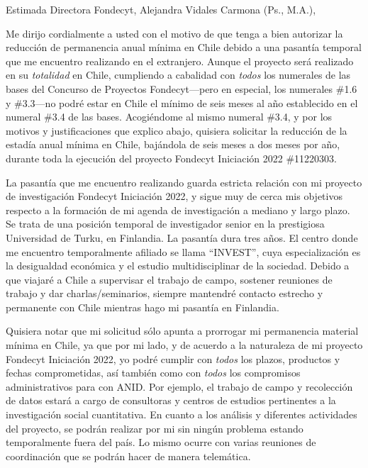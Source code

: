 \documentclass[9pt,stdletter,dateno,sigleft,openany]{newlfm} %
\begin{document}
\begin{newlfm}




\vspace{-2cm}
Estimada Directora Fondecyt, Alejandra Vidales Carmona (Ps., M.A.),

Me dirijo cordialmente a usted con el motivo de que tenga a bien autorizar la reducci\'on de permanencia anual m\'inima en Chile debido a una pasant\'ia temporal que me encuentro realizando en el extranjero. Aunque el proyecto ser\'a realizado en su \emph{totalidad} en Chile, cumpliendo a cabalidad con \emph{todos} los numerales de las bases del Concurso de Proyectos Fondecyt---pero en especial, los numerales \#1.6 y \#3.3---no podr\'e estar en Chile el m\'inimo de seis meses al a\~no establecido en el numeral \#3.4 de las bases. Acogi\'endome al mismo numeral \#3.4, y por los motivos y justificaciones que explico abajo, quisiera solicitar la reducci\'on de la estad\'ia anual m\'inima en Chile, baj\'andola de seis meses a dos meses por a\~no, durante toda la ejecuci\'on del proyecto Fondecyt Iniciaci\'on 2022 \#11220303. 

La pasant\'ia que me encuentro realizando guarda estricta relaci\'on con mi proyecto de investigaci\'on Fondecyt Iniciaci\'on 2022, y sigue muy de cerca mis objetivos respecto a la formaci\'on de mi agenda de investigaci\'on a mediano y largo plazo. Se trata de una posici\'on temporal de investigador senior en la prestigiosa Universidad de Turku, en Finlandia. La pasant\'ia dura tres a\~nos. El centro donde me encuentro temporalmente afiliado se llama ``INVEST'', cuya especializaci\'on es la desigualdad econ\'omica y el estudio multidisciplinar de la sociedad. Debido a que viajar\'e a Chile a supervisar el trabajo de campo, sostener reuniones de trabajo y dar charlas/seminarios, siempre mantendr\'e contacto estrecho y permanente con Chile mientras hago mi pasant\'ia en Finlandia. 

Quisiera notar que mi solicitud s\'olo apunta a prorrogar mi permanencia material m\'inima en Chile, ya que por mi lado, y de acuerdo a la naturaleza de mi proyecto Fondecyt Iniciaci\'on 2022, yo podr\'e cumplir con \emph{todos} los plazos, productos y fechas comprometidas, as\'i tambi\'en como con \emph{todos} los compromisos administrativos para con ANID. Por ejemplo, el trabajo de campo y recolecci\'on de datos estar\'a a cargo de consultoras y centros de estudios pertinentes a la investigaci\'on social cuantitativa. En cuanto a los an\'alisis y diferentes actividades del proyecto, se podr\'an realizar por mi sin ning\'un problema estando temporalmente fuera del pa\'is. Lo mismo ocurre con varias reuniones de coordinaci\'on que se podr\'an hacer de manera telem\'atica.


\end{newlfm}
\end{document}
